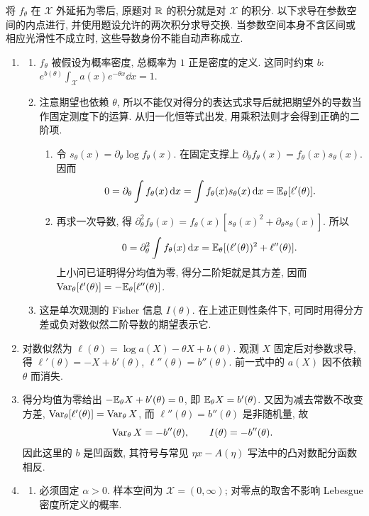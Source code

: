 \begin{solution}
将 $f_\theta$ 在 $\mathcal X$ 外延拓为零后, 原题对 $\mathbb R$ 的积分就是对 $\mathcal X$ 的积分. 以下求导在参数空间的内点进行, 并使用题设允许的两次积分求导交换. 当参数空间本身不含区间或相应光滑性不成立时, 这些导数身份不能自动声称成立.
\begin{enumerate}[label=\arabic*.]
\item
\begin{enumerate}[label=\alph*)]
\item $f_\theta$ 被假设为概率密度, 总概率为 $1$ 正是密度的定义. 这同时约束 $b$: $e^{b(\theta)}\int_{\mathcal X}a(x)e^{-\theta x}\dd x=1$.
\item 注意期望也依赖 $\theta$, 所以不能仅对得分的表达式求导后就把期望外的导数当作固定测度下的运算. 从归一化恒等式出发, 用乘积法则才会得到正确的二阶项.
\begin{enumerate}[label=\arabic*.]
\item 令 $s_\theta(x)=\partial_\theta\log f_\theta(x)$. 在固定支撑上 $\partial_\theta f_\theta(x)=f_\theta(x)s_\theta(x)$. 因而
\[
0=\partial_\theta\int f_\theta(x)\,\mathrm d x
=\int f_\theta(x)s_\theta(x)\,\mathrm d x
=\mathbb E_\theta[\ell'(\theta)].
\]
\item 再求一次导数, 得 $\partial_\theta^2 f_\theta(x)=f_\theta(x)[s_\theta(x)^2+\partial_\theta s_\theta(x)]$. 所以
\[
0=\partial_\theta^2\int f_\theta(x)\,\mathrm d x
=\mathbb E_\theta[(\ell'(\theta))^2+\ell''(\theta)].
\]
上小问已证明得分均值为零, 得分二阶矩就是其方差, 因而 $\operatorname{Var}_\theta[\ell'(\theta)]=-\mathbb E_\theta[\ell''(\theta)]$.
\end{enumerate}
\item 这是单次观测的 Fisher 信息 $I(\theta)$. 在上述正则性条件下, 可同时用得分方差或负对数似然二阶导数的期望表示它.
\end{enumerate}
\item 对数似然为 $\ell(\theta)=\log a(X)-\theta X+b(\theta)$. 观测 $X$ 固定后对参数求导, 得 $\ell'(\theta)=-X+b'(\theta)$, $\ell''(\theta)=b''(\theta)$. 前一式中的 $a(X)$ 因不依赖 $\theta$ 而消失.
\item 得分均值为零给出 $-\mathbb E_\theta X+b'(\theta)=0$, 即 $\mathbb E_\theta X=b'(\theta)$. 又因为减去常数不改变方差, $\operatorname{Var}_\theta[\ell'(\theta)]=\operatorname{Var}_\theta X$, 而 $\ell''(\theta)=b''(\theta)$ 是非随机量, 故
\[
\operatorname{Var}_\theta X=-b''(\theta),\qquad I(\theta)=-b''(\theta).
\]
因此这里的 $b$ 是凹函数, 其符号与常见 $\eta x-A(\eta)$ 写法中的凸对数配分函数相反.
\item
\begin{enumerate}[label=\alph*)]
\item 必须固定 $\alpha>0$. 样本空间为 $\mathcal X=(0,\infty)$; 对零点的取舍不影响 Lebesgue 密度所定义的概率.

\end{enumerate}
\end{enumerate}
\end{solution}
